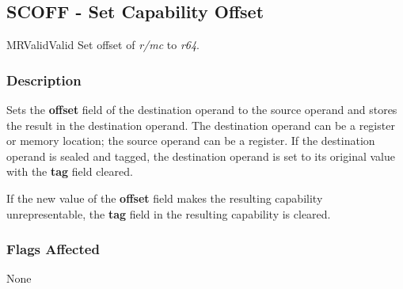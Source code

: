 \clearpage
{}
{}
\subsection*{SCOFF - Set Capability Offset}

\begin{x86opcodetable}
  {MR}{Valid}{Valid}
  {Set offset of \emph{r/mc} to \emph{r64}.}
\end{x86opcodetable}

\begin{x86opentable}
\end{x86opentable}

\subsubsection*{Description}

Sets the \textbf{offset} field of the destination operand to the
source operand and stores the result in the destination operand.  The
destination operand can be a register or memory location; the source
operand can be a register.  If the destination operand is sealed and
tagged, the destination operand is set to its original value with the
\textbf{tag} field cleared.

If the new value of the \textbf{offset} field makes the resulting
capability unrepresentable, the \textbf{tag} field in the resulting
capability is cleared.

\subsubsection*{Flags Affected}

None
